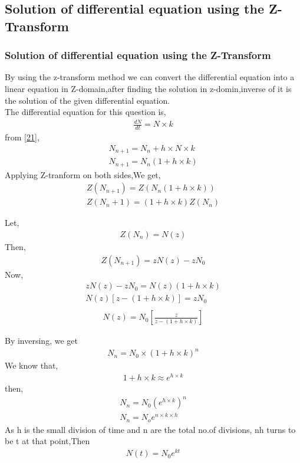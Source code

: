 \documentclass{beamer}
\providecommand{\sbrak}[1]{\ensuremath{{}\left[#1\right]}}
\providecommand{\brak}[1]{\ensuremath{\left(#1\right)}}
\theoremstyle{remark}
\numberwithin{equation}{section}
\begin{document}
\subsection{Solution of differential equation using the Z-Transform}
\begin{frame}[fragile]
\frametitle{Solution of differential equation using the Z-Transform}
By using the z-transform method we can convert the differential equation into a linear equation in Z-domain,after finding the solution in z-domin,inverse of it is the solution of the given differential equation. \\
The differential equation for this question is,
\begin{align}
\frac{dN}{dt}=N \times k
\end{align}
from \eqref{21}, \\
\begin{align}
N_{n+1}=N_{n}+h \times N \times k \\
N_{n+1}=N_{n}(1+h \times k)
\end{align}
Applying Z-tranform on both sides,We get,
\begin{align}
Z\brak{N_{n+1}}=Z\brak{N_{n}(1+h \times k)} \\
Z(N_n+1)=(1+h\times k)Z(N_n)
\end{align}
\end{frame}
\begin{frame}[fragile]
Let,
\begin{align}
Z\brak{N_n}=N\brak{z}
\end{align}
Then,
\begin{align}
Z\brak{N_{n+1}}=zN(z)-zN_0
\end{align}
Now,
\begin{align}
zN(z)-zN_0 = N(z)(1+h\times k) \\
N(z) \sbrak{z-\brak{1+h \times k}} = zN_0 \\
\end{align}
\begin{align}
N(z) = N_0 \sbrak{\frac{z}{z-\brak{1+h \times k}}}
\end{align}
\end{frame}
\begin{frame}[fragile]
    By inversing, we get 
\begin{align}
N_n = N_0 \times \brak{1+h \times k}^n
\end{align}
We know that,
\begin{align}
1+h \times k \approx e^{h \times k}
\end{align}
then,
\begin{align}
N_n = N_0 \brak{e^{h\times k}}^n \\
N_n = N_o e^{n\times k \times h}
\end{align}
As h is the small division of time and n are the total no.of divisions, nh turns to be t at that point,Then
\begin{align}
N\brak{t}=N_0e^{kt}
\end{align}
\end{frame}
\end{document}
